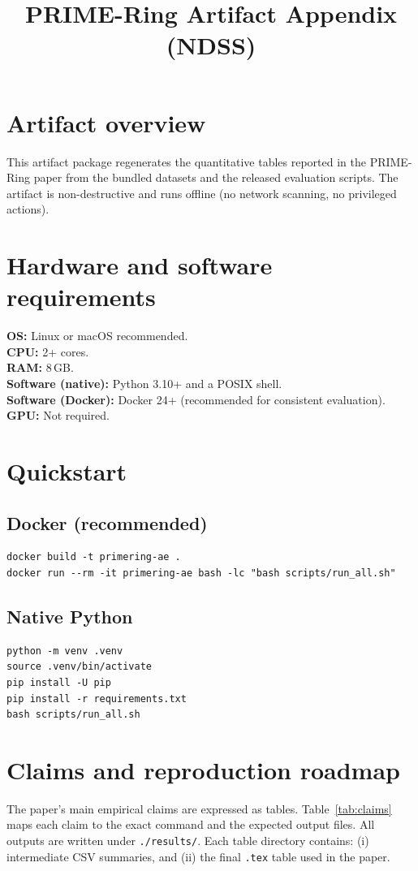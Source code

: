 \documentclass[letterpaper,twocolumn,10pt]{article}
\title{PRIME-Ring Artifact Appendix (NDSS)}
\author{}
\date{}
\begin{document}
\maketitle

\section{Artifact overview}
This artifact package regenerates the quantitative tables reported in the PRIME-Ring paper from the bundled datasets and the released evaluation scripts.
The artifact is non-destructive and runs offline (no network scanning, no privileged actions).

\section{Hardware and software requirements}
\textbf{OS:} Linux or macOS recommended. \\
\textbf{CPU:} 2+ cores. \\
\textbf{RAM:} 8\,GB. \\
\textbf{Software (native):} Python 3.10+ and a POSIX shell. \\
\textbf{Software (Docker):} Docker 24+ (recommended for consistent evaluation). \\
\textbf{GPU:} Not required.

\section{Quickstart}
\subsection{Docker (recommended)}
\begin{lstlisting}[basicstyle=\ttfamily\small]
docker build -t primering-ae .
docker run --rm -it primering-ae bash -lc "bash scripts/run_all.sh"
\end{lstlisting}

\subsection{Native Python}
\begin{lstlisting}[basicstyle=\ttfamily\small]
python -m venv .venv
source .venv/bin/activate
pip install -U pip
pip install -r requirements.txt
bash scripts/run_all.sh
\end{lstlisting}

\section{Claims and reproduction roadmap}
The paper's main empirical claims are expressed as tables. Table~\ref{tab:claims} maps each claim to the exact command and the expected output files.
All outputs are written under \texttt{./results/}. Each table directory contains: (i) intermediate CSV summaries, and (ii) the final \texttt{.tex} table used in the paper.
\end{document}
